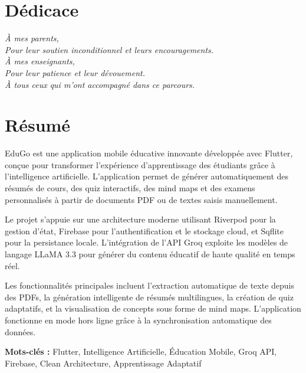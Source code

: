 \documentclass[12pt,a4paper]{report}
\begin{document}
\chapter*{Dédicace}
\thispagestyle{empty}
\vspace*{5cm}
\begin{center}
\textit{À mes parents,\\
Pour leur soutien inconditionnel et leurs encouragements.\\
\vspace{1cm}
À mes enseignants,\\
Pour leur patience et leur dévouement.\\
\vspace{1cm}
À tous ceux qui m'ont accompagné dans ce parcours.}
\end{center}
\newpage

\chapter*{Résumé}
\thispagestyle{empty}

EduGo est une application mobile éducative innovante développée avec Flutter, conçue pour transformer l'expérience d'apprentissage des étudiants grâce à l'intelligence artificielle. L'application permet de générer automatiquement des résumés de cours, des quiz interactifs, des mind maps et des examens personnalisés à partir de documents PDF ou de textes saisis manuellement.

Le projet s'appuie sur une architecture moderne utilisant Riverpod pour la gestion d'état, Firebase pour l'authentification et le stockage cloud, et Sqflite pour la persistance locale. L'intégration de l'API Groq exploite les modèles de langage LLaMA 3.3 pour générer du contenu éducatif de haute qualité en temps réel.

Les fonctionnalités principales incluent l'extraction automatique de texte depuis des PDFs, la génération intelligente de résumés multilingues, la création de quiz adaptatifs, et la visualisation de concepts sous forme de mind maps. L'application fonctionne en mode hors ligne grâce à la synchronisation automatique des données.

\textbf{Mots-clés :} Flutter, Intelligence Artificielle, Éducation Mobile, Groq API, Firebase, Clean Architecture, Apprentissage Adaptatif

\newpage
\end{document}
